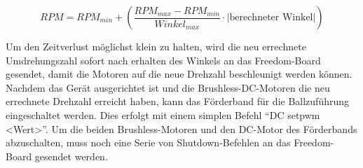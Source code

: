 \begin{equation}
RPM = RPM_{min} +  \left( \frac{RPM_{max} -RPM_{min}}{Winkel_{max}} \cdot |\text{berechneter Winkel}| \right)
\end{equation}
 
Um den Zeitverlust möglichst klein zu halten, wird die neu errechnete Umdrehungszahl sofort nach erhalten des Winkels an das 
Freedom-Board gesendet, damit die Motoren auf die neue Drehzahl beschleunigt werden können.
Nachdem das Gerät ausgerichtet ist und die Brushless-DC-Motoren die neu errechnete Drehzahl erreicht haben, kann das Förderband 
für die Ballzuführung eingeschaltet werden. Dies erfolgt mit einem simplen Befehl \enquote{DC setpwm <Wert>}. 
Um die beiden Brushless-Motoren und den DC-Motor des Förderbands abzuschalten, muss noch eine Serie von Shutdown-Befehlen an das 
Freedom-Board gesendet werden. 


            
            
